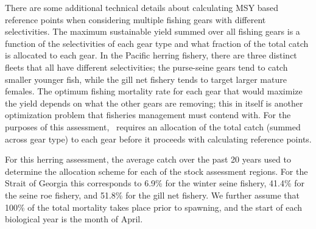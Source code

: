 
There are some additional technical details about calculating MSY based reference points when considering multiple fishing gears with different selectivities.  The maximum sustainable yield summed over all fishing gears is a function of the selectivities of each gear type and what fraction of the total catch is allocated to each gear.  In the Pacific herring fishery, there are three distinct fleets that all have different selectivities; the purse-seine gears tend to catch smaller younger fish, while the gill net fishery tends to target larger mature females.  The optimum fishing mortality rate for each gear that would maximize the yield depends on what the other gears are removing; this in itself is another optimization problem that fisheries management must contend with.  For the purposes of this assessment, \iscam\ requires an allocation of the total catch (summed across gear type) to each gear before it proceeds with calculating reference points.

For this herring assessment, the average catch over the past 20 years used to determine the allocation scheme for each of the stock assessment regions.  For the Strait of Georgia this corresponds to 6.9\% for the winter seine fishery, 41.4\% for the seine roe fishery, and 51.8\% for the gill net fishery.  We further assume that 100\% of the total mortality takes place prior to spawning, and the start of each biological year is the month of April.


